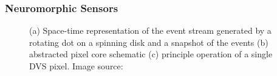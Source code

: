 \subsubsection{Neuromorphic Sensors}
\label{subsubsec:neuro_sensors}

\begin{figure}[t!]
	\centering
	\par\medskip
	\begin{minipage}{.48\columnwidth}
		\centering
	\end{minipage}%
	\begin{minipage}{.48\columnwidth}
		\centering
	\end{minipage}\par\medskip
	\caption{(a) Space-time representation of the event stream generated by a rotating dot on a spinning disk and a snapshot of the events (b) abstracted pixel core schematic (c) principle operation of a single \ac{DVS} pixel. Image source: \textcite{Lichtsteiner2008}}
	\label{fig:DVS_with_schem}
\end{figure}

